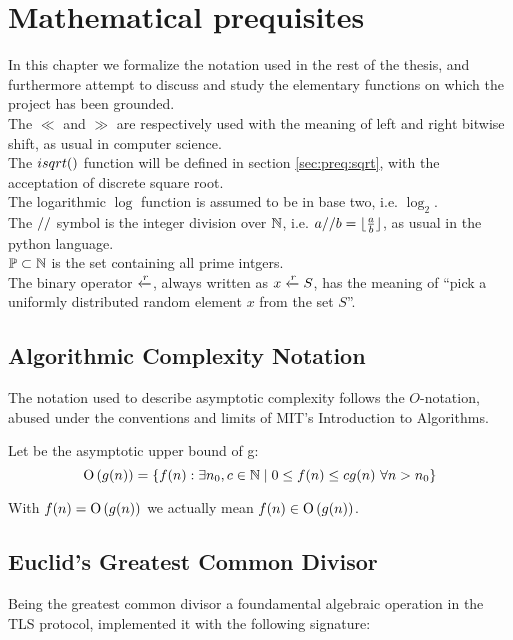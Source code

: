 \chapter{Mathematical prequisites \label{chap:preq}}

In this chapter we formalize the notation used in the rest of the thesis, and
furthermore attempt to discuss and study the elementary functions on which the
project has been grounded.
\\
The $\ll$ and $\gg$ are respectively used with the meaning of left and right
bitwise shift, as usual in computer science.
\\
The $\dsqrt$ function will be defined in section \ref{sec:preq:sqrt}, with the
acceptation of discrete square root.
\\
The logarithmic $\log$ function is assumed to be in base two, i.e. $\log_2$.
\\
The $//$ symbol is the integer division over $\mathbb{N}$, i.e.
$a // b = \lfloor\frac{a}{b}\rfloor$, as usual in the python language.
\\
$\mathbb{P} \subset \mathbb{N}$ is the set containing all prime intgers.
\\
The binary operator $\xleftarrow{r}$, always written as $x \xleftarrow{r} S$, has the
meaning of ``pick a uniformly distributed random element $x$ from the set $S$''.

\section{Algorithmic Complexity Notation}
The notation used to describe asymptotic complexity follows the $O$-notation,
abused under the conventions and limits of MIT's Introduction to Algorithms.

Let  be the asymptotic upper bound of g:
$$
\operatorname{O}\left(g(n)\right) = \{ f(n) : \exists n_0, c \in \mathbb{N} \mid 0 \leq f(n) \leq cg(n)
\ \forall n > n_0 \}
$$

With $f(n) = \operatorname{O}\left(g(n)\right)$ we actually mean
$f(n) \in \operatorname{O}\left(g(n)\right)$.

\section{Euclid's Greatest Common Divisor \label{sec:preq:gcd}}

Being the greatest common divisor a foundamental algebraic operation in the TLS
protocol, \openssl implemented it with the following signature:


